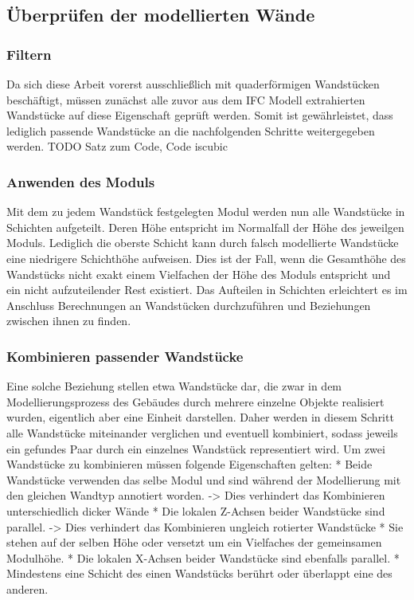 \subsection{Überprüfen der modellierten Wände}
\subsubsection{Filtern}
Da sich diese Arbeit vorerst ausschließlich mit quaderförmigen Wandstücken beschäftigt, müssen zunächst alle zuvor aus dem IFC Modell extrahierten Wandstücke auf diese Eigenschaft geprüft werden.
Somit ist gewährleistet, dass lediglich passende Wandstücke an die nachfolgenden Schritte weitergegeben werden.
TODO Satz zum Code, Code iscubic

\subsubsection{Anwenden des Moduls}
Mit dem zu jedem Wandstück festgelegten Modul werden nun alle Wandstücke in Schichten aufgeteilt.
Deren Höhe entspricht im Normalfall der Höhe des jeweilgen Moduls.
Lediglich die oberste Schicht kann durch falsch modellierte Wandstücke eine niedrigere Schichthöhe aufweisen.
Dies ist der Fall, wenn die Gesamthöhe des Wandstücks nicht exakt einem Vielfachen der Höhe des Moduls entspricht und ein nicht aufzuteilender Rest existiert.
Das Aufteilen in Schichten erleichtert es im Anschluss Berechnungen an Wandstücken durchzuführen und Beziehungen zwischen ihnen zu finden.

\subsubsection{Kombinieren passender Wandstücke}
Eine solche Beziehung stellen etwa Wandstücke dar, die zwar in dem Modellierungsprozess des Gebäudes durch mehrere einzelne Objekte realisiert wurden, eigentlich aber eine Einheit darstellen.
Daher werden in diesem Schritt alle Wandstücke miteinander verglichen und eventuell kombiniert, sodass jeweils ein gefundes Paar durch ein einzelnes Wandstück representiert wird.
Um zwei Wandstücke zu kombinieren müssen folgende Eigenschaften gelten:
* Beide Wandstücke verwenden das selbe Modul und sind während der Modellierung mit den gleichen Wandtyp annotiert worden. -> Dies verhindert das Kombinieren unterschiedlich dicker Wände
* Die lokalen Z-Achsen beider Wandstücke sind parallel. -> Dies verhindert das Kombinieren ungleich rotierter Wandstücke
* Sie stehen auf der selben Höhe oder versetzt um ein Vielfaches der gemeinsamen Modulhöhe.
* Die lokalen X-Achsen beider Wandstücke sind ebenfalls parallel.
* Mindestens eine Schicht des einen Wandstücks berührt oder überlappt eine des anderen.

